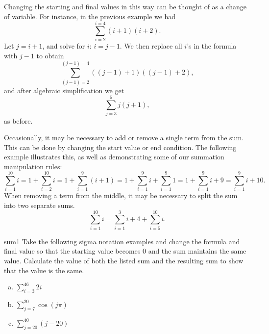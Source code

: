 Changing the starting and final values in this way can be thought of as a change of variable. For instance, in the previous example we had
\[\sum_{i=2}^{i=4}(i+1)(i+2).\]
Let $j = i+1$, and solve for $i$: $i = j-1$. We then replace all $i$'s in the formula with $j-1$ to obtain
\[\sum_{(j-1)=2}^{(j-1)=4}((j-1)+1)((j-1)+2),\]
and after algebraic simplification we get
\[\sum_{j=3}^{5}j(j+1),\]
as before.

Occasionally, it may be necessary to add or remove a single term from the sum.  This can be done by changing the start value or end condition. The following example illustrates this, as well as demonstrating some of our summation manipulation rules:
\[\sum_{i=1}^{10}i = 1 + \sum_{i=2}^{10} i = 1+ \sum_{i=1}^9 ( i+1) = 1 +  \sum_{i=1}^9  i +  \sum_{i=1}^9  1 = 1+ \sum_{i=1}^9  i + 9 =  \sum_{i=1}^9  i + 10.\]
When removing a term from the middle, it may be necessary to split the sum into two separate sums.
\[\sum_{i=1}^{10}i = \sum_{i=1}^{3}i + 4 + \sum_{i=5}^{10}i.\]

\begin{exercise}{sum1}
Take the following sigma notation examples and change the formula and final value so that the starting value becomes 0 and the sum maintains the same value.  Calculate the value of both the listed sum and the resulting sum to show that the value is the same.
\begin{enumerate} [(a)]
 \item
$\displaystyle{\sum_{i=3}^{46}2i}$
\item
$\displaystyle{\sum_{j=7}^{20}\cos(j\pi )}$
\item
$\displaystyle{\sum_{j=20}^{40}(j-20)}$
\end {enumerate}
\end{exercise}


